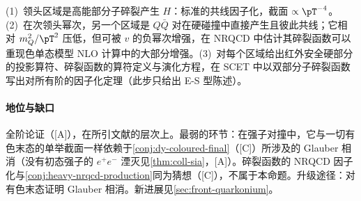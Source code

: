 \begin{proofsketch}
(1)~领头区域是高能部分子碎裂产生 $H$：标准的共线因子化，截面 $\propto\pT^{-4}$。(2)~在次领头幂次，另一个区域是 $Q\bar Q$ 对在硬碰撞中直接产生且彼此共线；它相对 $m_Q^2/\pT^2$ 压低，但可被 $v$ 的负幂次增强\cite{Fleming:2012wy}，在 NRQCD 中估计其碎裂函数可以重现色单态模型 NLO 计算中的大部分增强\cite{Kang:2011mg}。(3)~对每个区域给出红外安全硬部分的投影算符、碎裂函数的算符定义与演化方程\cite{Kang:2014tta}，在 SCET 中以双部分子碎裂函数写出对所有阶的因子化定理\cite{Fleming:2012wy}（此步只给出 E-S 型陈述）。
\end{proofsketch}

\paragraph{地位与缺口}
全阶论证（[A]），在所引文献\cite{Kang:2011mg,Kang:2014tta,Fleming:2012wy}的层次上。最弱的环节：在强子对撞中，它与一切有色末态的单举截面一样依赖于\cref{conj:dy-coloured-final}（[C]）所涉及的 Glauber 相消（没有初态强子的 $e^+e^-$ 湮灭见\cref{thm:coll-sia}，[A]）。碎裂函数的 NRQCD 因子化与\cref{conj:heavy-nrqcd-production}同为猜想（[C]），不属于本命题。升级途径：对有色末态证明 Glauber 相消。新进展见\cref{sec:front-quarkonium}。
